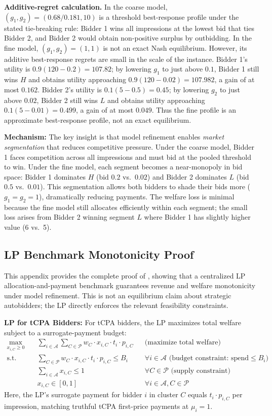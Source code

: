 \documentclass{article}
\theoremstyle{plain}
\theoremstyle{definition}
\theoremstyle{remark}
\newcommand{\cA}{\mathcal{A}}
\newcommand{\cP}{\mathcal{P}}
\begin{document}
\textbf{Additive-regret calculation.} In the coarse model, $(g_1, g_2) = (0.68/0.181,10)$ is a threshold best-response profile under the stated tie-breaking rule: Bidder 1 wins all impressions at the lowest bid that ties Bidder 2, and Bidder 2 would obtain non-positive surplus by outbidding. In the fine model, $(g_1,g_2)=(1,1)$ is not an exact Nash equilibrium. However, its additive best-response regrets are small in the scale of the instance. Bidder 1's utility is $0.9(120-0.2)=107.82$; by lowering $g_1$ to just above $0.1$, Bidder 1 still wins $H$ and obtains utility approaching $0.9(120-0.02)=107.982$, a gain of at most $0.162$. Bidder 2's utility is $0.1(5-0.5)=0.45$; by lowering $g_2$ to just above $0.02$, Bidder 2 still wins $L$ and obtains utility approaching $0.1(5-0.01)=0.499$, a gain of at most $0.049$. Thus the fine profile is an approximate best-response profile, not an exact equilibrium.

\textbf{Mechanism:} The key insight is that model refinement enables \emph{market segmentation} that reduces competitive pressure. Under the coarse model, Bidder 1 faces competition across all impressions and must bid at the pooled threshold to win. Under the fine model, each segment becomes a near-monopoly in bid space: Bidder 1 dominates $H$ (bid $0.2$ vs.\ $0.02$) and Bidder 2 dominates $L$ (bid $0.5$ vs.\ $0.01$). This segmentation allows both bidders to shade their bids more ($g_1 = g_2 = 1$), dramatically reducing payments. The welfare loss is minimal because the fine model still allocates efficiently within each segment; the small loss arises from Bidder 2 winning segment $L$ where Bidder 1 has slightly higher value (6 vs.\ 5).

\subsection{LP Benchmark Monotonicity Proof}
\label{app:lp-mono}

This appendix provides the complete proof of , showing that a centralized LP allocation-and-payment benchmark guarantees revenue and welfare monotonicity under model refinement. This is not an equilibrium claim about strategic autobidders; the LP directly enforces the relevant feasibility constraints.

\textbf{LP for tCPA Bidders:} For tCPA bidders, the LP maximizes total welfare subject to a surrogate-payment budget:
\begin{align}
\max_{x_{i,C} \geq 0} \quad & \sum_{i \in \cA} \sum_{C \in \cP} w_C \cdot x_{i,C} \cdot t_i \cdot p_{i,C} && \text{(maximize total welfare)} \\
\text{s.t.} \quad & \sum_{C \in \cP} w_C \cdot x_{i,C} \cdot t_i \cdot p_{i,C} \leq B_i && \forall i \in \cA \text{ (budget constraint: spend} \leq B_i\text{)} \\
& \sum_{i \in \cA} x_{i,C} \leq 1 && \forall C \in \cP \text{ (supply constraint)} \\
& x_{i,C} \in [0,1] && \forall i \in \cA, C \in \cP
\end{align}
Here, the LP's surrogate payment for bidder $i$ in cluster $C$ equals $t_i \cdot p_{i,C}$ per impression, matching truthful tCPA first-price payments at $\mu_i=1$.
\end{document}
